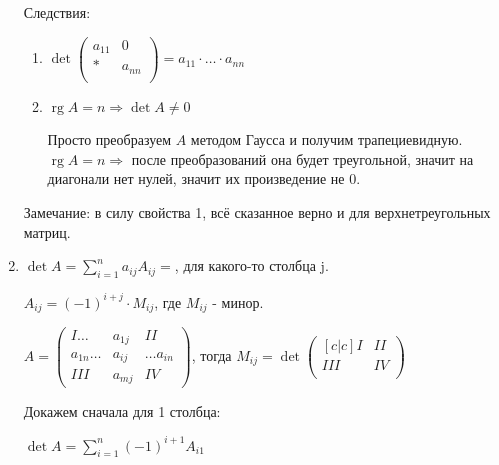 \documentclass[twoside]{book}
\DeclareMathOperator{\rg}{rg}
\begin{document}
\begin{enumerate}
          Следствия:
          \begin{enumerate}
              \item \(\det\begin{pmatrix}
                        a_{11} & 0      \\
                        *      & a_{nn} \\
                    \end{pmatrix} = a_{11} \cdot \ldots \cdot a_{nn}\)\\
              \item  \(\rg{A} = n \Rightarrow \det A \neq 0\)

                    Просто преобразуем \(A\) методом Гаусса и получим трапециевидную. \(\rg{A} = n \Rightarrow\) после преобразований она будет треугольной, значит на диагонали нет нулей, значит их произведение не 0.
          \end{enumerate}

          Замечание: в силу свойства 1, всё сказанное верно и для верхнетреугольных матриц.

    \item \(\det A = \sum\limits_{i=1}^n a_{ij} A_{ij} = \), для какого-то столбца j.

          \( A_{ij} = ({-1})^{i+j} \cdot M_{ij}\), где \(M_{ij}\) - минор.

          \(A=\begin{pmatrix}
              I \ldots      & a_{1j} & II             \\
              a_{1n} \ldots & a_{ij} & \ldots  a_{in} \\
              III           & a_{mj} & IV
          \end{pmatrix}\), тогда \(M_{ij} = \det
          \begin{pmatrix}[c|c]
              I   & II \\
              \hline
              III & IV \\
          \end{pmatrix}\)

          Докажем сначала для 1 столбца:

          \(\det A = \sum\limits_{i = 1}^n (-1)^{i+1} A_{i1}\)


\end{enumerate}
\end{document}
